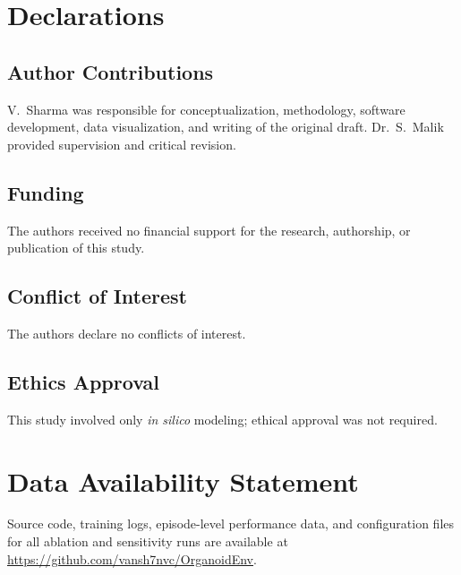 \documentclass[journal,twocolumn]{IEEEtran}
\begin{document}
\section*{Declarations}

\subsection*{Author Contributions}
V.~Sharma was responsible for conceptualization, methodology, software
development, data visualization, and writing of the original draft.
Dr.~S.~Malik provided supervision and critical revision.

\subsection*{Funding}
The authors received no financial support for the research, authorship,
or publication of this study.

\subsection*{Conflict of Interest}
The authors declare no conflicts of interest.

\subsection*{Ethics Approval}
This study involved only \emph{in silico} modeling; ethical approval
was not required.

\section*{Data Availability Statement}

Source code, training logs, episode-level performance data, and
configuration files for all ablation and sensitivity runs are available
at \url{https://github.com/vansh7nvc/OrganoidEnv}.
\end{document}
